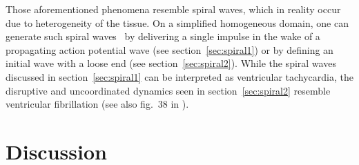 Those aforementioned phenomena resemble spiral waves, which in reality occur
due to heterogeneity of the tissue. On a simplified homogeneous domain, one can
generate such spiral waves \eg~by delivering a single impulse in the wake of a
propagating action potential wave (see section~\ref{sec:spiral1}) or by
defining an initial wave with a loose end (see section~\ref{sec:spiral2}).
While the spiral waves discussed in section~\ref{sec:spiral1} can be
interpreted as ventricular tachycardia, the disruptive and uncoordinated
dynamics seen in section~\ref{sec:spiral2} resemble ventricular fibrillation
(see also fig.~38 in \cite{Cherry2008}).


\section{Discussion}


